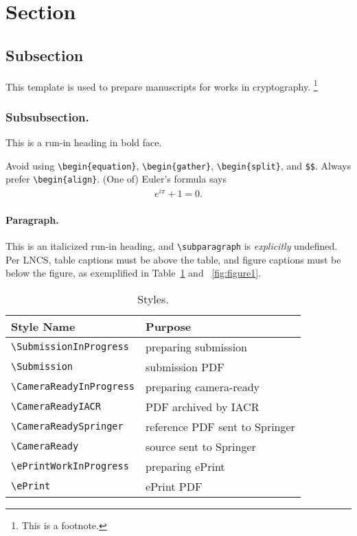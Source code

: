 \section{Section}
\subsection{Subsection}

This template is used to prepare manuscripts for works in cryptography.%
\footnote{This is a footnote.}

\subsubsection{Subsubsection.}
This is a run-in heading in bold face.

Avoid using \texttt{\textbackslash begin\{equation\}},
\texttt{\textbackslash begin\{gather\}},
\texttt{\textbackslash begin\{split\}},
and \texttt{\$\$}.
Always prefer \texttt{\textbackslash begin\{align\}}.
(One of) Euler's formula says
\begin{align*}
e^{i\pi}+1=0.
\end{align*}

\paragraph{Paragraph.}
This is an italicized run-in heading, and
\texttt{\textbackslash subparagraph} is \emph{explicitly} undefined.
Per LNCS, table captions must be above the table,
and figure captions must be below the figure,
as exemplified in Table~\ref{tab:table1} and \Figure~\ref{fig:figure1}.

\begin{table}[h]
\centering
\caption{Styles.}
\label{tab:table1}
\begin{tabular}{ll}
\toprule
Style Name & Purpose \\
\midrule
\texttt{\textbackslash SubmissionInProgress} &
preparing submission \\
\texttt{\textbackslash Submission} &
submission PDF \\
\texttt{\textbackslash CameraReadyInProgress} &
preparing camera-ready \\
\texttt{\textbackslash CameraReadyIACR} &
PDF archived by IACR \\
\texttt{\textbackslash CameraReadySpringer} &
reference PDF sent to Springer \\
\texttt{\textbackslash CameraReady} &
source sent to Springer \\
\texttt{\textbackslash ePrintWorkInProgress} &
preparing ePrint \\
\texttt{\textbackslash ePrint} &
ePrint PDF \\
\bottomrule
\end{tabular}
\end{table}

